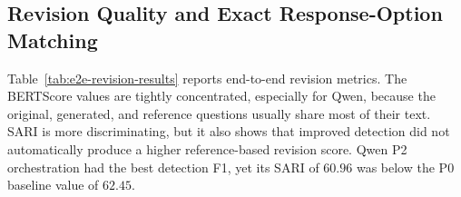 \documentclass[11pt,a4paper]{article}
\begin{document}
\subsection{Revision Quality and Exact Response-Option Matching}
\label{subsec:revision-results}
\label{subsec:evaluation-challenges}

Table~\ref{tab:e2e-revision-results} reports end-to-end revision metrics. The
BERTScore values are tightly concentrated, especially for Qwen, because the
original, generated, and reference questions usually share most of their text.
SARI is more discriminating, but it also shows that improved detection did not
automatically produce a higher reference-based revision score. Qwen P2
orchestration had the best detection F1, yet its SARI of $60.96$ was below the
P0 baseline value of $62.45$.
\end{document}
